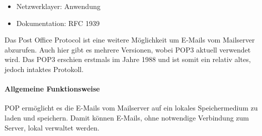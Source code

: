 \documentclass[12pt,a4paper]{report}
\begin{document}
\begin{onehalfspace}
\begin{itemize}
\begin{itemize}
\end{itemize}
\item Netzwerklayer: Anwendung
\item Dokumentation: RFC 1939
\end{itemize}
Das Post Office Protocol ist eine weitere Möglichkeit um E-Mails vom Mailserver abzurufen. Auch hier gibt es mehrere Versionen, wobei POP3 aktuell verwendet wird. Das POP3 erschien erstmals im Jahre 1988 und ist somit ein relativ altes, jedoch intaktes Protokoll.
\paragraph{Allgemeine Funktionsweise\\}
POP ermöglicht es die E-Mails vom Mailserver auf ein lokales Speichermedium zu laden und speichern. Damit können E-Mails, ohne notwendige Verbindung zum Server, lokal verwaltet werden. \\


\end{onehalfspace}
\end{document}
